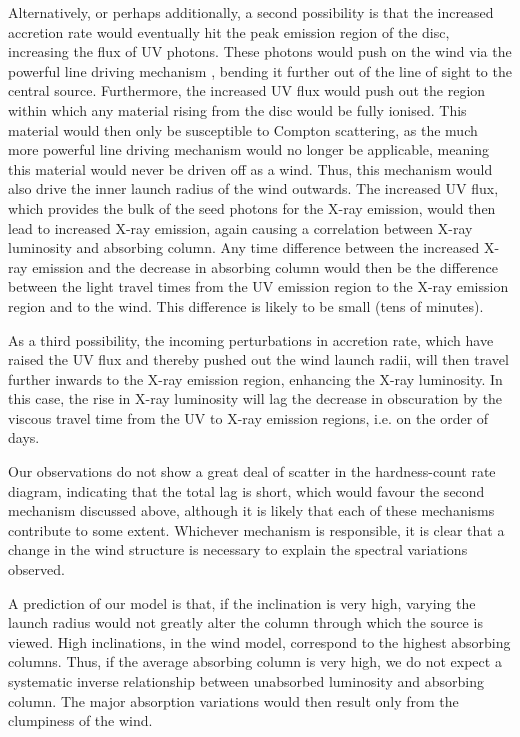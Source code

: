 \documentclass[useAMS,usenatbib]{sam}
\begin{document}
Alternatively, or perhaps additionally, a second possibility is that the increased accretion rate would eventually hit the peak emission region of the disc, increasing
the flux of UV photons. These photons would push on the wind via the powerful line driving mechanism \citep{proga99}, bending it further out of the line of sight to the
central source. Furthermore, the increased UV flux would push out the region within which any material rising from the disc would be fully ionised. This material would
then only be susceptible to Compton scattering, as the much more powerful line driving mechanism would no longer be applicable, meaning this material would never be
driven off as a wind. Thus, this mechanism would also drive the inner launch radius of the wind outwards. The increased UV flux, which provides the bulk of the seed
photons for the X-ray emission, would then lead to increased X-ray emission, again causing a correlation between X-ray luminosity and absorbing column. Any time
difference between the increased X-ray emission and the decrease in absorbing column would then be the difference between the light travel times from the UV emission
region to the X-ray emission region and to the wind. This difference is likely to be small (tens of minutes). 

As a third possibility, the incoming perturbations in accretion rate, which have raised the UV flux and thereby pushed out the wind launch radii, will then travel further
inwards to the X-ray emission region, enhancing the X-ray luminosity. In this case, the rise in X-ray luminosity will lag the decrease in obscuration by the viscous
travel time from the UV to X-ray emission regions, i.e. on the order of days.

Our observations do not show a great deal of scatter in the hardness-count rate diagram, indicating that the total lag is short, which would favour the second mechanism
discussed above, although it is likely that each of these mechanisms contribute to some extent. Whichever mechanism is responsible, it is clear that a change
in the wind structure is necessary to explain the spectral variations observed.

A prediction of our model is that, if the inclination is very high, varying the launch radius would not greatly alter the column through which the source is
viewed. High inclinations, in the wind model, correspond to the highest absorbing columns. Thus, if the average absorbing column is very high, we do not
expect a systematic inverse relationship between unabsorbed luminosity and absorbing column. The major absorption variations would then result only from the clumpiness of
the wind.
\end{document}
